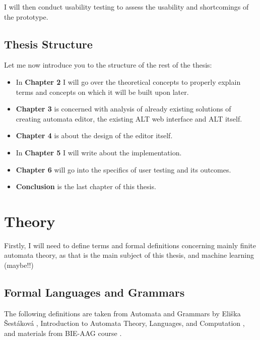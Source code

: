 I will then conduct usability testing to assess the usability and shortcomings of the prototype.

\section{Thesis Structure}

Let me now introduce you to the structure of the rest of the thesis:

\begin{itemize}
\item In \textbf{Chapter 2} I will go over the theoretical concepts to properly explain terms and concepts on which it will be built upon later.

\item \textbf{Chapter 3} is concerned with analysis of already existing solutions of creating automata editor, the existing ALT web interface and ALT itself.

\item \textbf{Chapter 4} is about the design of the editor itself.

\item In \textbf{Chapter 5} I will write about the implementation.

\item \textbf{Chapter 6} will go into the specifics of user testing and its outcomes.

\item \textbf{Conclusion} is the last chapter of this thesis.

\end{itemize}

\chapter{Theory}
\label{chap:theory}

Firstly,  I will need to define terms and formal definitions concerning mainly finite automata theory, as that is the main subject of this thesis, and machine learning (maybe!!)

\section{Formal Languages and Grammars}
 
The following definitions are taken from Automata and Grammars by Eliška Šestáková \cite{automata-and-grammars}, Introduction to Automata Theory, Languages, and Computation \cite{introduction-automata}, and materials from BIE-AAG course \cite{lectures}.


